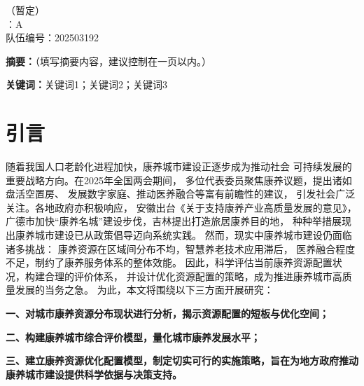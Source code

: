 \documentclass[12pt,a4paper]{article}
\begin{document}
\thispagestyle{empty}
\begin{center}
    （暂定） \\
    \vspace{1em}
    ：A \\
    \quad 队伍编号：202503192 \\
\end{center}

\vspace{2em}

\noindent\textbf{摘要：}（填写摘要内容，建议控制在一页以内。）

\vspace{1em}

\noindent\textbf{关键词：}关键词1；关键词2；关键词3

\newpage

\section{引言}

随着我国人口老龄化进程加快，康养城市建设正逐步成为推动社会
可持续发展的重要战略方向。在2025年全国两会期间，
多位代表委员聚焦康养议题，提出诸如盘活空置房、
发展数字家庭、推动医养融合等富有前瞻性的建议，
引发社会广泛关注。各地政府亦积极响应，
安徽出台《关于支持康养产业高质量发展的意见》\cite{01}，
广德市加快“康养名城”建设步伐，吉林提出打造旅居康养目的地，
种种举措展现出康养城市建设已从政策倡导迈向系统实践。
然而，现实中康养城市建设仍面临诸多挑战：
康养资源在区域间分布不均，智慧养老技术应用滞后，
医养融合程度不足，制约了康养服务体系的整体效能。
因此，科学评估当前康养资源配置状况，构建合理的评价体系，
并设计优化资源配置的策略，成为推进康养城市高质量发展的当务之急。
为此，本文将围绕以下三方面开展研究：

\textbf{一、对城市康养资源分布现状进行分析，揭示资源配置的短板与优化空间；}

\textbf{二、构建康养城市综合评价模型，量化城市康养发展水平；}

\textbf{三、建立康养资源优化配置模型，制定切实可行的实施策略，旨在为地方政府推动康养城市建设提供科学依据与决策支持。}
\end{document}
